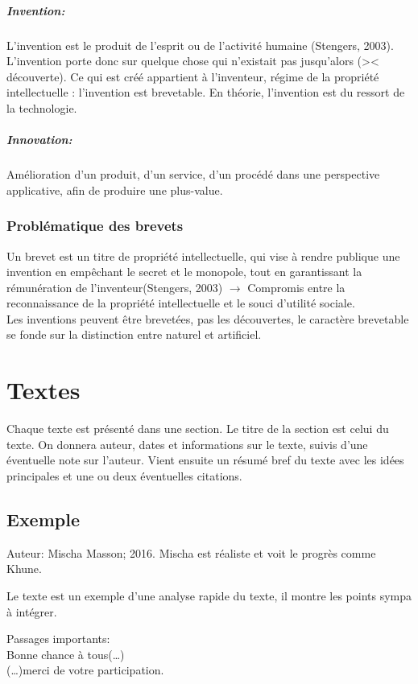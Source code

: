 \documentclass{report}
\begin{document}
	\paragraph{Invention:} L’invention \og est le produit de l’esprit ou de l’activité humaine \fg (Stengers, 2003). L’invention porte donc sur quelque chose qui n’existait pas jusqu'alors (>< découverte). Ce qui est créé appartient à l’inventeur, régime de la propriété intellectuelle : l’invention est brevetable. En théorie, l’invention est du ressort de la technologie.
	
	\paragraph{Innovation:} Amélioration d'un produit, d'un service, d'un procédé dans une perspective applicative, afin de produire une plus-value.
	
	\subsection{Problématique des brevets}
	
	Un brevet est un titre de propriété intellectuelle, qui \og vise à rendre publique une invention en empêchant le secret et le monopole, tout en garantissant la rémunération de l’inventeur\fg (Stengers, 2003) $\rightarrow$ Compromis entre la reconnaissance de la propriété intellectuelle et le souci d’utilité sociale.\\
	Les inventions peuvent être brevetées, pas les découvertes, le caractère brevetable se fonde sur la distinction entre naturel et artificiel.
	
	\appendix
	
	\chapter{Textes}
	
	Chaque texte est présenté dans une section. Le titre de la section est celui du texte. On donnera auteur, dates et informations sur le texte, suivis d'une éventuelle note sur l'auteur. Vient ensuite un résumé bref du texte avec les idées principales et une ou deux éventuelles citations.
	
	\section{Exemple}
	Auteur: Mischa Masson; 2016. Mischa est réaliste et voit le progrès comme Khune.
	
	Le texte est un exemple d'une analyse rapide du texte, il montre les points sympa à intégrer.
	
	Passages importants:\\
	\og Bonne chance à tous(\dots)\fg\\
	\og (\dots)merci de votre participation.\fg
	
\end{document}
